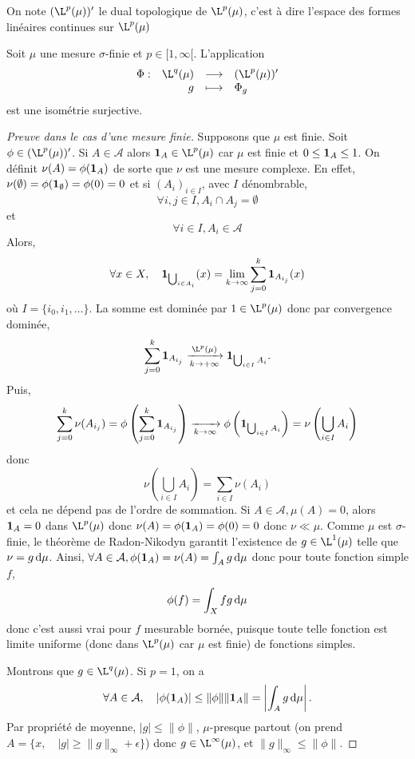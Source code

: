 \begin{dfn}[Notation]
    On note $(\L^p(\mu))'$ le dual topologique de $\L^p(\mu)$, c'est à dire l'espace des formes linéaires continues sur $\L^p(\mu)$
\end{dfn}

\begin{thm}
Soit $\mu$ une mesure $\sigma$-finie et  $p \in  [1, \infty[$. L'application \[
\begin{array}{rrcl}
    \Phi:& \L^q(\mu) & \longrightarrow & (\L^p(\mu))' \\
    & g & \longmapsto & \displaystyle \Phi_g
\end{array}
\] 
est une isométrie surjective.
\end{thm}

\begin{proof}[Preuve dans le cas d'une mesure finie]
Supposons que $\mu$ est finie.  
    Soit $\phi \in (\L^p(\mu))'$. Si $A\in \mathcal{A}$ alors $\1_A\in \L^p(\mu)$ car $\mu$ est finie
    et $0\leq \bm{1}_A\leq 1$.
    On définit $\nu(A)= \phi(\bm{1}_A)$ de sorte que  $\nu$ est une mesure complexe.
    En effet, $\nu(\emptyset)=\phi(\bm{1}_\emptyset)= \phi(0)=0$ 
    et si $(A_i)_{i \in  I}$, avec $I$ dénombrable, \[\forall i,j\in I,A_i\cap A_j=\emptyset\] et \[\forall i\in I,A_i\in \mathcal{A}\]
    Alors,
    \[ \forall x\in X, \quad  \bm{1}_{\bigcup_{i\in A_i}} (x)= \lim_{k\to \infty}\sum_{j=0}^k \bm{1}_{A_{i_j}}(x)\] où $I=\{i_0,i_1,\dots \}$.
    La somme est dominée par  $1\in \L^p(\mu)$ donc par convergence dominée, \[\displaystyle\sum_{j=0}^k \1_{A_{i_j}}\xrightarrow[k\to +\infty]{\L^p(\mu)} \1_{\bigcup_{i\in I}A_i}.\]
    Puis,
        \[\sum_{j=0}^k\nu(A_{i_j}) = \phi\left(\sum_{j=0}^k \bm{1}_{A_{i_j}}\right)\xrightarrow[k\to \infty]{} \phi\left(\bm{1}_{\bigcup_{i\in I}A_i}\right)= \nu\left(\bigcup_{i\in I}A_i\right)\]
        donc \[\nu\left(\bigcup_{i\in I}A_i\right)= \sum_{i\in I}\nu(A_i)\] et cela ne dépend pas de l'ordre de sommation.
Si $A\in \mathcal{A},\mu(A)=0$, alors $\bm{1}_A=0$ dans $\L^p(\mu)$ donc $\nu(A) =\phi(\bm{1}_A) =\phi(0)=0$ donc $\nu\ll \mu$.
Comme $\mu$ est $\sigma$-finie, le théorème de Radon-Nikodyn garantit l'existence de $g\in \L^1(\mu)$ telle que $\nu=g\mathop{}\!\mathrm d\mu$.
Ainsi, $\forall A\in \mathcal{A}, \phi(\bm{1}_A) =\nu(A)= \int_Ag\mathop{}\!\mathrm d\mu$ donc pour toute fonction simple $f$, \[\phi(f)=\int_X fg\mathop{}\!\mathrm d\mu\]
donc c'est aussi vrai pour $f$ mesurable bornée, puisque toute telle fonction est limite uniforme (donc dans $\L^p(\mu)$ car $\mu$ est finie) de fonctions simples.

Montrons que $g\in \L^q(\mu)$.
Si $p=1$, on a \[\forall A\in \mathcal{A}, \quad  |\phi(\bm{1}_A)|\leq \|\phi\|\|\bm{1}_A \| =\left| \int_A g\mathop{}\!\mathrm d\mu \right|.\]
Par propriété de moyenne, $|g|\leq \|\phi\|$, $\mu$-presque partout 
(on prend $A= \{x, \quad  |g|\geq \|g\|_{\infty}+\epsilon\}$)
donc $g\in \L^{\infty}(\mu)$, et $\|g\|_\infty \leq \|\phi\|$.


\end{proof}
